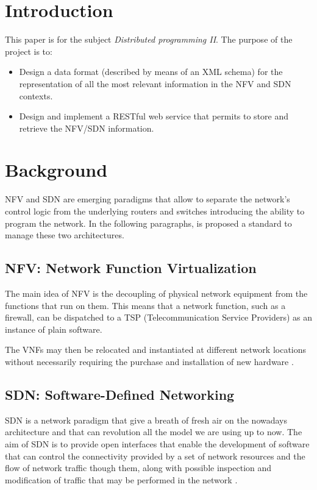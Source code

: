 \documentclass[11pt, english]{article}
\begin{document}
\newcommand{\CC}{C\nolinebreak\hspace{-.05em}\raisebox{.4ex}{\tiny\bf +}\nolinebreak\hspace{-.10em}\raisebox{.4ex}{\tiny\bf +}}
\def\CC{{C\nolinebreak[4]\hspace{-.05em}\raisebox{.4ex}{\tiny\bf ++}}}

\tableofcontents
\newpage

\section{Introduction}
This paper is for the subject \textit{Distributed programming II}. The purpose of the project is to:
\begin{itemize}
    \item Design a data format (described by means of an XML schema) for the representation of all the most relevant information in the NFV and SDN contexts.
    \item Design and implement a RESTful web service that permits to store and retrieve the NFV/SDN information.
\end{itemize}

\section{Background}
NFV and SDN are emerging paradigms that allow to separate the network’s control logic from the underlying routers and switches introducing the ability to program the network. In the following paragraphs, is proposed a standard to manage these two architectures.

\subsection{NFV: Network Function Virtualization}
The main idea of NFV is the decoupling of physical network equipment from the functions that run on them. This means that a network function, such as a firewall, can be dispatched to a TSP (Telecommunication Service Providers) as an instance of plain software.

The VNFs may then be relocated and instantiated at different network locations without necessarily requiring the purchase and installation of new hardware \cite{nfv_architecture}.

\subsection{SDN: Software-Defined Networking}
SDN is a network paradigm that give a breath of fresh air on the nowadays architecture and that can revolution all the model we are using up to now. The aim of SDN is to provide open interfaces that enable the development of software that can control the connectivity provided by a set of network resources and the flow of network traffic though them, along with possible inspection and modification of traffic that may be performed in the network \cite{sdn_architecture}.
\end{document}
